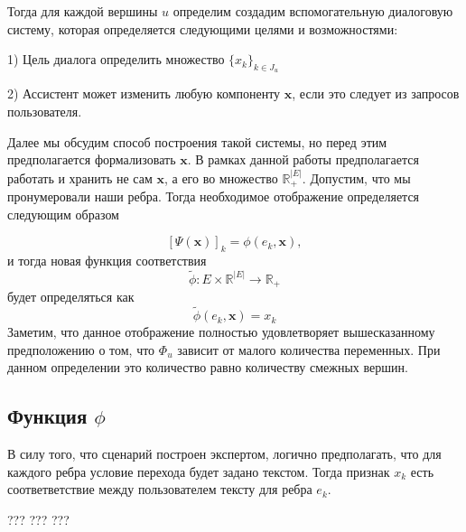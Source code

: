 \documentclass[12pt]{article}
\begin{document}
Тогда для каждой вершины $u$ определим создадим вспомогательную диалоговую систему, которая определяется следующими целями и возможностями:

1) Цель диалога определить множество $\{x_k\}_{k\in J_u}$

2) Ассистент может изменить любую компоненту $\textbf{x}$, если это следует из запросов пользователя.

Далее мы обсудим способ построения такой системы, но перед этим предполагается формализовать $\textbf{x}$. В рамках данной работы предполагается работать и хранить не сам $\textbf{x}$, а его во множество $\mathbb{R}^{|E|}_+$. Допустим, что мы пронумеровали наши ребра. Тогда необходимое отображение определяется следующим образом

$$\left[\Psi(\textbf{x})\right]_k = \phi(e_k, \textbf{x}),$$
и тогда новая функция соответствия $$\tilde{\phi}:E\times\mathbb{R}^{|E|}\rightarrow \mathbb{R}_+$$ будет определяться как
$$\tilde{\phi}(e_k, \textbf{x}) = x_k$$
Заметим, что данное отображение полностью удовлетворяет вышесказанному предположению о том, что $\Phi_u$ зависит от малого количества переменных. При данном определении это количество равно количеству смежных вершин.

\subsection{Функция $\phi$}

В силу того, что сценарий построен экспертом, логично предполагать, что для каждого ребра условие перехода будет задано текстом. Тогда признак $x_k$ есть соответветствие между пользователем тексту для ребра $e_k$.

\begin{thebibliography}{3}
???
???
???
\end{thebibliography}
\end{document}
